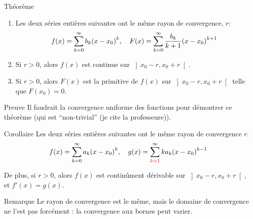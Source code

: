 \documentclass[a4paper]{article}
\begin{document}
\begin{parag}{Théorème}
    \begin{enumerate}[left=0pt]
    \item Les deux séries entières suivantes ont le même rayon de convergence, $r$: 
        \[f\left(x\right) = \sum_{k=0}^{\infty} b_k \left(x - x_0\right)^{k}, \mathspace F\left(x\right) = \sum_{k=0}^{\infty} \frac{b_k}{k+1} \left(x - x_0\right)^{k+1}\]
    \item Si $r > 0$, alors $f\left(x\right)$ est continue sur $\left]x_0 - r, x_0 + r\right[ $. 
    \item Si $r > 0$, alors $F\left(x\right)$ est la primitive de $f\left(x\right)$ sur $\left]x_0 - r, x_0 + r\right[ $ telle que $F\left(x_0\right) = 0$.
    \end{enumerate}
    
    \begin{subparag}{Preuve}
        Il faudrait la convergence uniforme des fonctions pour démontrer ce théorème (qui est ``non-trivial'' (je cite la professeure)).
    \end{subparag}
\end{parag}

\begin{parag}{Corollaire}
    Les deux séries entières suivantes ont le même rayon de convergence $r$.
    \[f\left(x\right) = \sum_{k=0}^{\infty} a_k \left(x - x_0\right)^k, \mathspace g\left(x\right) = \sum_{{\color{red}k=1}}^{\infty} k a_k \left(x - x_0\right)^{k-1}\]

    De plus, si $r > 0$, alors $f\left(x\right)$ est continûment dérivable sur $\left]x_0 - r, x_0 + r\right[ $, et $f'\left(x\right) = g\left(x\right)$.

    \begin{subparag}{Remarque}
        Le rayon de convergence est le même, mais le domaine de convergence ne l'est pas forcément : la convergence aux bornes peut varier.
    \end{subparag}
\end{parag}
\end{document}
